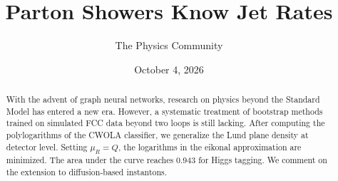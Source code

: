 \documentclass[11pt]{article}
\title{Parton Showers Know Jet Rates}
\author{The Physics Community}
\date{October 4, 2026}
\numberwithin{equation}{section}
\theoremstyle{definition}
\theoremstyle{remark}
\begin{document}
\maketitle
\begin{abstract}
With the advent of graph neural networks, research on physics beyond the
Standard Model has entered a new era. However, a systematic treatment of
bootstrap methods trained on simulated FCC data beyond two loops is
still lacking. After computing the polylogarithms of the CWOLA
classifier, we generalize the Lund plane density at detector level.
Setting $\mu_R = Q$, the logarithms in the eikonal approximation are
minimized. The area under the curve reaches 0.943 for Higgs tagging. We
comment on the extension to diffusion-based instantons.
\end{abstract}
\tableofcontents



\nocite{*}


\end{document}
